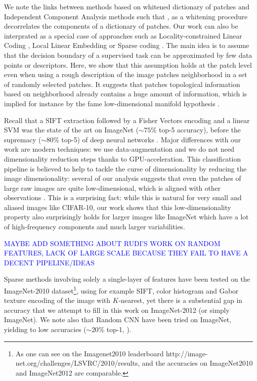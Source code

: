 \documentclass{article}
\newcommand{\Edouard}[1]{\textcolor{blue}{#1}}
\begin{document}
We  note the links between methods based on whitened dictionary of patches and Independent Component Analysis methods such that \citep{ngiam2010tiled}, as a whitening procedure decorrelates the components of a dictionary of patches. Our work can also be interprated as a special case of approaches such as Locality-constrained Linear Coding \citep{russakovsky2015imagenet,yu2010improved}, Local Linear Embedding \citep{Roweis2323} or Sparse coding \citep{bo2013multipath}. The main idea is to assume that the  decision boundary of a supervised task can be approximated by few data points or descriptors.
Here, we show that this assumption holds at the patch level even when using a rough description of the image patches neighborhood in a set of randomly selected patches.
It suggests that patches topological information based on neighborhood already contains a huge amount of information, which is implied for instance by the fame low-dimensional manifold hypothesis 
\citep{fefferman2016testing}.

Recall that a SIFT extraction \cite{lowe2004distinctive} followed by a Fisher Vectors  encoding \citep{sanchez2013image} and a linear SVM was the state of the art on ImageNet ($\sim 75\% $ top-5 accuracy), before the supremacy ($\sim 80$\% top-5) of deep neural networks \citet{krizhevsky2012imagenet}.
Major differences with our work are modern techniques: we use data-augmentation and we do not need dimensionality reduction steps thanks to GPU-acceleration. This classification pipeline is believed to help to tackle the curse of dimensionality by reducing the image dimensionality: several of our analysis  suggests that even the patches of large raw images are quite low-dimensional, which is aligned with other observations
\citep{Oyallon_2017_CVPR}. This is a surprising fact: while this is natural for very small and aliased  images like CIFAR-10, our work shows that this low-dimensionality property also surprisingly holds for larger images like ImageNet which have a lot of high-frequency components and much larger variabilities.


\Edouard{MAYBE ADD SOMETHING ABOUT RUDI'S WORK ON RANDOM FEATURES, LACK OF LARGE SCALE BECAUSE THEY FAIL TO HAVE A DECENT PIPELINE/IDEAS}

Sparse methods involving solely a single-layer of  features  have been tested on the ImageNet-2010 dataset\footnote{ As one can see on the Imagenet2010 leaderboard http://image-net.org/challenges/LSVRC/2010/results, and the accuracies on ImageNet2010 and ImageNet2012 are comparable.}, using for example SIFT, color histogram and Gabor texture encoding of the image with $K$-nearest, yet there is a substential gap in accuracy that we attempt to fill in this work on ImageNet-2012 (or simply ImageNet). We note also that Random CNN have been tried on ImageNet, yielding to low accuracies ($\sim 20\%$ top-1, \citep{arandjelovic2017look}).
\end{document}
